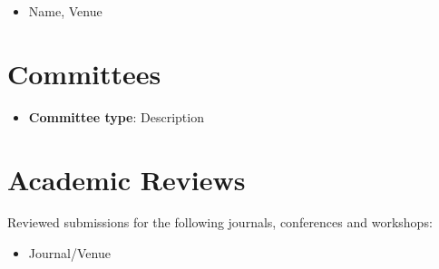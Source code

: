 \begin{itemize}
    \item Name, Venue
\end{itemize}


\section*{Committees}
\label{sec:cxra:localcommittees}

\begin{itemize}
    \item \textbf{Committee type}: Description
\end{itemize}


\section*{Academic Reviews}
\label{sec:cxra:referee}

Reviewed submissions for the following journals, conferences and workshops:
\begin{itemize}
    \item Journal/Venue
\end{itemize}
